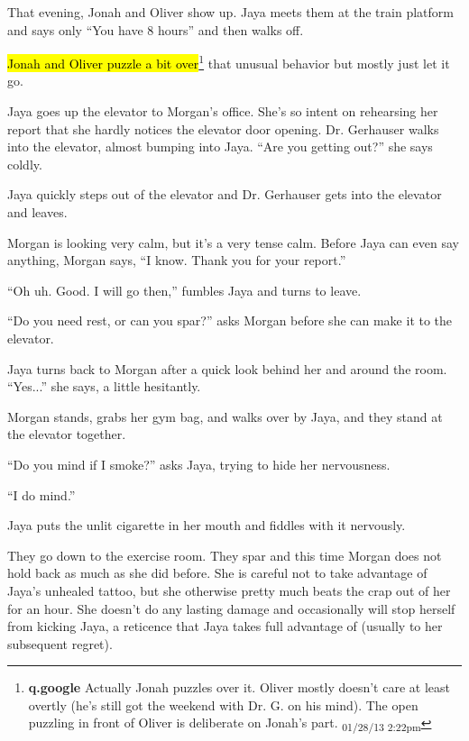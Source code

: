 That evening, Jonah and Oliver show up.  Jaya meets them at the train platform and says only ``You have 8 hours'' and then walks off.



\hl{Jonah and Oliver puzzle a bit over}\footnote{\textbf{q.google }Actually Jonah puzzles over it.  Oliver mostly doesn't care at least overtly (he's still got the weekend with Dr. G. on his mind).  The open puzzling in front of Oliver is deliberate on Jonah's part. \textsubscript{01/28/13 2:22pm}} that unusual behavior but mostly just let it go.



Jaya goes up the elevator to Morgan's office.  She's so intent on rehearsing her report that she hardly notices the elevator door opening.  Dr. Gerhauser walks into the elevator, almost bumping into Jaya.  ``Are you getting out?'' she says coldly.



Jaya quickly steps out of the elevator and Dr. Gerhauser gets into the elevator and leaves.



Morgan is looking very calm, but it's a very tense calm.  Before Jaya can even say anything, Morgan says, ``I know.  Thank you for your report.''

``Oh uh.  Good.  I will go then,'' fumbles Jaya and turns to leave.

``Do you need rest, or can you spar?'' asks Morgan before she can make it to the elevator.

Jaya turns back to Morgan after a quick look behind her and around the room.  ``Yes...'' she says, a little hesitantly.

Morgan stands, grabs her gym bag, and walks over by Jaya, and they stand at the elevator together.  

``Do you mind if I smoke?'' asks Jaya, trying to hide her nervousness.

``I do mind.''

Jaya puts the unlit cigarette in her mouth and fiddles with it nervously.



They go down to the exercise room.  They spar and this time Morgan does not hold back as much as she did before.  She is careful not to take advantage of Jaya's unhealed tattoo, but she otherwise pretty much beats the crap out of her for an hour.  She doesn't do any lasting damage and occasionally will stop herself from kicking Jaya, a reticence that Jaya takes full advantage of (usually to her subsequent regret).



